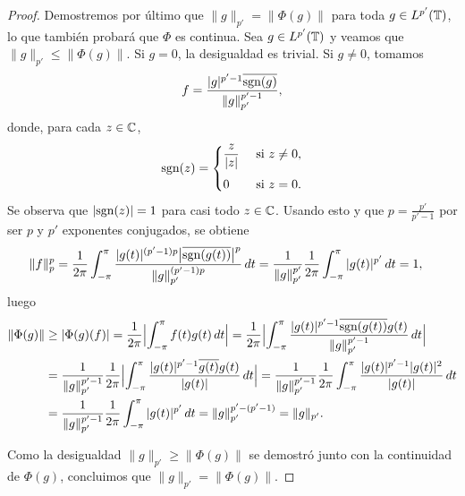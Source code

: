 \documentclass[a4paper, 12pt]{book}
\begin{document}
\begin{proof}
    Demostremos por último que $\|g\|_{p'} = \|\Phi(g)\|$ para toda $g \in L^{p'}(\mathbb T)$, lo que también probará que $\Phi$ es continua. Sea $g \in L^{p'}(\mathbb T)$ y veamos que $\|g\|_{p'} \leq \|\Phi(g)\|$. Si $g = 0$, la desigualdad es trivial. Si $g \neq 0$, tomamos
    \[f = \frac{|g|^{p'-1}\overline{\textup{sgn}(g)}}{\|g\|^{p'-1}_{p'}},\]
    donde, para cada $z \in \mathbb C$,
    \[\sgn(z) = \begin{cases}
        \displaystyle \frac{z}{|z|} & $ si $ z \neq 0, \\[10pt]
        0 & $ si $ z = 0.
    \end{cases}\]
    Se observa que $|\textup{sgn}(z)| = 1$ para casi todo $z\in\mathbb C$. Usando esto y que $p = \frac{p'}{p'-1}$ por ser $p$ y $p'$ exponentes conjugados, se obtiene
    \[\begin{aligned}[t]
        \|f\|_p^p &= \frac{1}{2\pi}\int_{-\pi}^{\pi} \frac{|g(t)|^{(p'-1)p}\bigl|\overline{\textup{sgn} (g(t))}\bigr|^p}{\|g\|_{p'}^{(p'-1)p}} \, dt = \frac{1}{\|g\|_{p'}^{p'}}\frac{1}{2\pi}\int_{-\pi}^{\pi} |g(t)|^{p'} \, dt = 1,
    \end{aligned}\]
    luego
    \[\begin{aligned}[t]
        \|\Phi(g)\| &\geq |\Phi(g)(f)| = \frac{1}{2\pi}\Bigl|\int_{-\pi}^{\pi} f(t)g(t) \, dt\Bigr| = \frac{1}{2\pi}\Bigl|\int_{-\pi}^{\pi} \frac{|g(t)|^{p'-1}\overline{\textup{sgn}(g(t))}g(t)}{\|g\|_{p'}^{p'-1}} \, dt\Bigr| \\
        &= \frac{1}{\|g\|_{p'}^{p'-1}} \frac{1}{2\pi}\Bigl|\int_{-\pi}^{\pi} \frac{|g(t)|^{p'-1}\overline{g(t)}g(t)}{|g(t)|} \, dt\Bigr| = \frac{1}{\|g\|_{p'}^{p'-1}} \frac{1}{2\pi}\int_{-\pi}^{\pi} \frac{|g(t)|^{p'-1}|g(t)|^2}{|g(t)|} \, dt
        \\ &= \frac{1}{\|g\|_{p'}^{p'-1}} \frac{1}{2\pi}\int_{-\pi}^{\pi} |g(t)|^{p'} \, dt = \|g\|_{p'}^{p'-(p'-1)} = \|g\|_{p'}.
    \end{aligned}\]

    Como la desigualdad $\|g\|_{p'} \geq \|\Phi(g)\|$ se demostró junto con la continuidad de $\Phi(g)$, concluimos que $\|g\|_{p'} = \|\Phi(g)\|$.
\end{proof}
\end{document}
